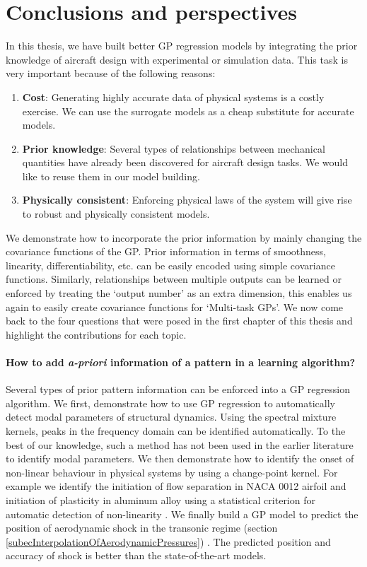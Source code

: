 \chapter{Conclusions and perspectives}
\label{chapConclusions}

In this thesis, we have built better GP regression models by integrating the prior knowledge of aircraft design with experimental or simulation data. This task is very important because of the following reasons:

\begin{enumerate}
\item \textbf{Cost}: Generating highly accurate data of physical systems is a costly exercise. We can use the surrogate models as a cheap substitute for accurate models.
\item \textbf{Prior knowledge}: Several types of relationships between mechanical quantities have already been discovered for aircraft design tasks. We would like to reuse them in our model building. 
\item \textbf{Physically consistent}: Enforcing physical laws of the system will give rise to robust and physically consistent models.
\end{enumerate}

We demonstrate how to incorporate the prior information by mainly changing the covariance functions of the GP. Prior information in terms of smoothness, linearity, differentiability, etc. can be easily encoded using simple covariance functions. Similarly, relationships between multiple outputs can be learned or enforced by treating the `output number' as an extra dimension, this enables us again to easily create covariance functions for `Multi-task GPs'. We now come back to the four questions that were posed in the first chapter of this thesis and highlight the contributions for each topic.

\subsubsection*{How to add \textit{a-priori} information of a pattern in a learning algorithm?}
Several types of prior pattern information can be enforced into a GP regression algorithm. We first,  demonstrate how to use GP regression to automatically detect modal parameters of structural dynamics. Using the spectral mixture kernels, peaks in the frequency domain can be identified automatically. To the best of our knowledge, such a method has not been used in the earlier literature to identify modal parameters. We then demonstrate how to identify the onset of non-linear behaviour in physical systems by using a change-point kernel. For example we identify the initiation of flow separation in NACA 0012 airfoil and initiation of plasticity in aluminum alloy using a statistical criterion for automatic detection of non-linearity \cite{chiplunkar:hal-01555401}. We finally build a GP model to predict the position of aerodynamic shock in the transonic regime (section \ref{subecInterpolationOfAerodynamicPressures}) \cite{oatao18004}. The predicted position and accuracy of shock is better than the state-of-the-art models. 
